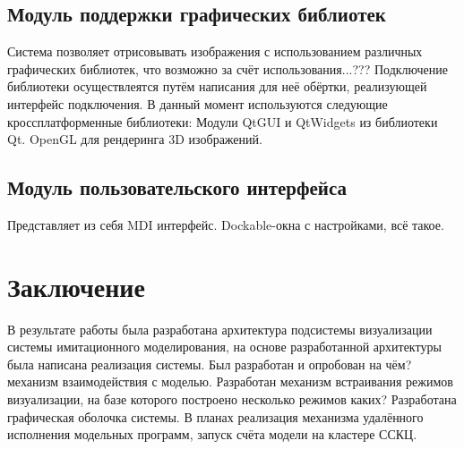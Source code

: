 \documentclass[a4paper,12pt]{extarticle}
\let\stdsection\section
\renewcommand\section{\newpage\stdsection}
\begin{document}
\subsection{Модуль поддержки графических библиотек}

Система позволяет отрисовывать изображения с использованием различных графических библиотек, что возможно за счёт использования...??? Подключение библиотеки осуществлеятся путём написания для неё обёртки, реализующей интерфейс подключения. В данный момент используются следующие кроссплатформенные библиотеки:
Модули QtGUI и QtWidgets из библиотеки Qt.
OpenGL для рендеринга 3D изображений.

\subsection{Модуль пользовательского интерфейса}
Представляет из себя MDI интерфейс. Dockable-окна с настройками, всё такое.



\section{Заключение}

В результате работы была разработана архитектура подсистемы визуализации системы имитационного моделирования, на основе разработанной архитектуры была написана реализация системы. Был разработан и опробован на чём? механизм взаимодействия с моделью. Разработан механизм встраивания режимов визуализации, на базе которого построено несколько режимов каких? Разработана графическая оболочка системы.
В планах реализация механизма удалённого исполнения модельных программ, запуск счёта модели на кластере ССКЦ.
\end{document}
